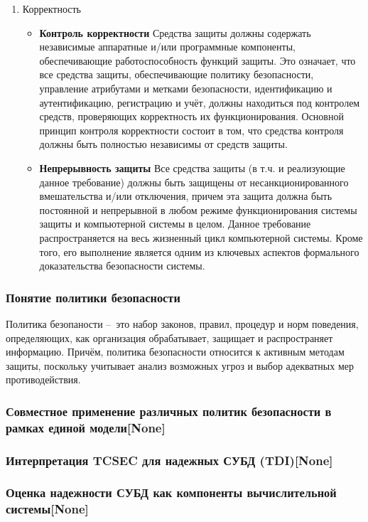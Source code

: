 \begin{enumerate}
	\item Корректность
	\begin{itemize}
		\item \textbf{Контроль корректности} Средства защиты должны содержать независимые аппаратные и/или программные компоненты, обеспечивающие работоспособность функций защиты. Это означает, что все средства защиты, обеспечивающие политику безопасности, управление атрибутами и метками безопасности, идентификацию и аутентификацию, регистрацию и учёт, должны находиться под контролем средств, проверяющих корректность их функционирования. Основной принцип контроля корректности состоит в том, что средства контроля должны быть полностью независимы от средств защиты.
		\item \textbf{Непрерывность защиты} Все средства защиты (в т.ч. и реализующие данное требование) должны быть защищены от несанкционированного вмешательства и/или отключения, причем эта защита должна быть постоянной и непрерывной в любом режиме функционирования системы защиты и компьютерной системы в целом. Данное требование распространяется на весь жизненный цикл компьютерной системы. Кроме того, его выполнение является одним из ключевых аспектов формального доказательства безопасности системы.
	\end{itemize}	
\end{enumerate}

\subsubsection{Понятие политики безопасности}
Политика безопаности -- это набор законов, правил, процедур и норм поведения, определяющих, как организация обрабатывает, защищает и распространяет информацию. Причём, политика безопасности относится к активным методам защиты, поскольку учитывает анализ возможных угроз и выбор адекватных мер противодействия.
\subsubsection{Совместное применение различных политик безопасности в рамках единой модели[None]}
\subsubsection{Интерпретация TCSEC для надежных СУБД (TDI)[None]}
\subsubsection{Оценка надежности СУБД как компоненты вычислительной системы[None]}
